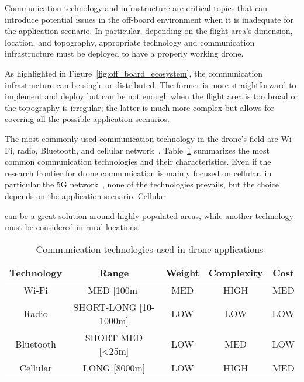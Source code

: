 Communication technology and infrastructure are critical topics that can introduce potential issues 
in the off-board environment when it is inadequate for the application scenario.
In particular, depending on the flight area's dimension, location, and topography, appropriate technology and communication infrastructure must be deployed to have a properly working drone.

As highlighted in Figure~\ref{fig:off_board_ecosystem}, the communication infrastructure can be single or distributed.
The former is more straightforward to implement and deploy but can be not enough when the flight area is too broad or the topography is irregular; 
the latter is much more complex but allows for covering all the possible application scenarios.

The most commonly used communication technology in the drone's field are Wi-Fi, radio, Bluetooth, and cellular network~\cite{pantelimon2019surveyCommunication}. 
Table~\ref{table:communication_technologies} summarizes the most common communication technologies and their characteristics.
Even if the research frontier for drone communication is mainly focused on cellular, in particular the 5G network~\cite{sharma2020communication},
none of the technologies prevails, but the choice depends on the application scenario. 
Cellular

can be a great solution around highly populated areas, while another technology must be considered in rural locations.


\begin{table}[tb]
    \centering
        \begin{tabular}{|c|c|c|c|c|}
        \hline
        \rowcolor{bluepoli!40}
        \textbf{Technology} & \textbf{Range} & \textbf{Weight} & \textbf{Complexity} & \textbf{Cost} \\
        \hline \hline
        Wi-Fi & MED [100m] & MED & HIGH & MED \\
        \hline
        Radio & SHORT-LONG [10-1000m] & LOW & LOW & LOW \\
        \hline
        Bluetooth & SHORT-MED [<25m] & LOW & MED & LOW \\
        \hline
        Cellular & LONG [8000m] & LOW & HIGH & MED \\
        \hline
        \end{tabular}
        \\[10pt]
        \caption[Communication technologies]{Communication technologies used in drone applications~\cite{pantelimon2019surveyCommunication}}\label{table:communication_technologies}
    \end{table}

